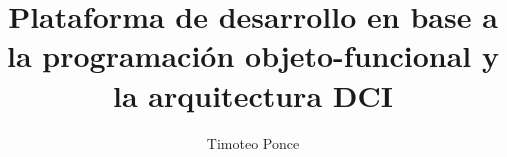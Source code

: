 \documentclass[letterpaper,12pt]{report}
\author{Timoteo Ponce}
\title{Plataforma de desarrollo en 
base a la programaci\'on objeto-funcional y la arquitectura DCI}
\begin{document}

\tableofcontents
\newpage
\listoffigures
\listoftables
\newpage




\printglossary



\end{document}
